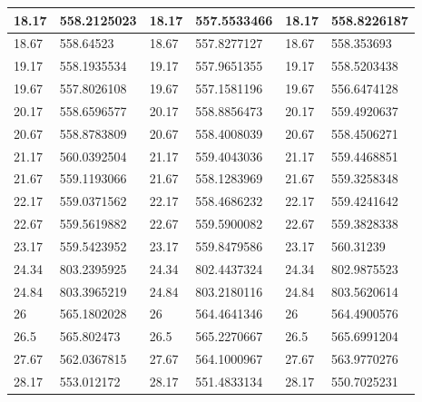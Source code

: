 \documentclass[11pt, letterpaper]{article}
\begin{document}
\begin{appendices}
\begin{table}[!ht]
\begin{tabular}{|l|l|l|l|l|l|}
        18.17 & 558.2125023 & 18.17 & 557.5533466 & 18.17 & 558.8226187 \\ \hline
        18.67 & 558.64523 & 18.67 & 557.8277127 & 18.67 & 558.353693 \\ \hline
        19.17 & 558.1935534 & 19.17 & 557.9651355 & 19.17 & 558.5203438 \\ \hline
        19.67 & 557.8026108 & 19.67 & 557.1581196 & 19.67 & 556.6474128 \\ \hline
        20.17 & 558.6596577 & 20.17 & 558.8856473 & 20.17 & 559.4920637 \\ \hline
        20.67 & 558.8783809 & 20.67 & 558.4008039 & 20.67 & 558.4506271 \\ \hline
        21.17 & 560.0392504 & 21.17 & 559.4043036 & 21.17 & 559.4468851 \\ \hline
        21.67 & 559.1193066 & 21.67 & 558.1283969 & 21.67 & 559.3258348 \\ \hline
        22.17 & 559.0371562 & 22.17 & 558.4686232 & 22.17 & 559.4241642 \\ \hline
        22.67 & 559.5619882 & 22.67 & 559.5900082 & 22.67 & 559.3828338 \\ \hline
        23.17 & 559.5423952 & 23.17 & 559.8479586 & 23.17 & 560.31239 \\ \hline
        24.34 & 803.2395925 & 24.34 & 802.4437324 & 24.34 & 802.9875523 \\ \hline
        24.84 & 803.3965219 & 24.84 & 803.2180116 & 24.84 & 803.5620614 \\ \hline
        26 & 565.1802028 & 26 & 564.4641346 & 26 & 564.4900576 \\ \hline
        26.5 & 565.802473 & 26.5 & 565.2270667 & 26.5 & 565.6991204 \\ \hline
        27.67 & 562.0367815 & 27.67 & 564.1000967 & 27.67 & 563.9770276 \\ \hline
        28.17 & 553.012172 & 28.17 & 551.4833134 & 28.17 & 550.7025231 \\ \hline
    \end{tabular}
\end{table}


\end{appendices}
\end{document}
